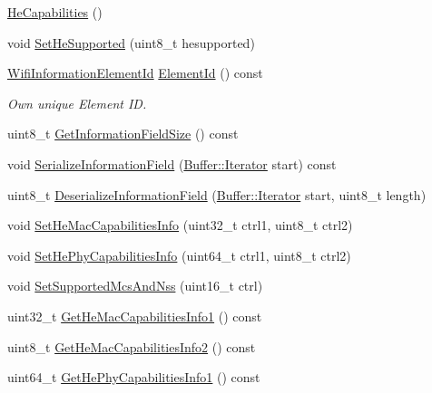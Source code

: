 \begin{DoxyCompactItemize}
\item 
\hyperlink{classns3_1_1HeCapabilities_a95908473615c6161c2783fa9c1cdecce}{He\+Capabilities} ()
\item 
void \hyperlink{classns3_1_1HeCapabilities_a27bea40f066d180bb70a5998583359c3}{Set\+He\+Supported} (uint8\+\_\+t hesupported)
\item 
\hyperlink{namespacens3_aeb185e0c8a60816016bca079f1420478}{Wifi\+Information\+Element\+Id} \hyperlink{classns3_1_1HeCapabilities_adda8ae15136a896da545f45ebf088632}{Element\+Id} () const 
\begin{DoxyCompactList}\small\item\em Own unique Element ID. \end{DoxyCompactList}\item 
uint8\+\_\+t \hyperlink{classns3_1_1HeCapabilities_a85af5c252ecd8d48a1628cd9f9163687}{Get\+Information\+Field\+Size} () const 
\item 
void \hyperlink{classns3_1_1HeCapabilities_a68225cd20307319d11a976ce9da3c4b2}{Serialize\+Information\+Field} (\hyperlink{classns3_1_1Buffer_1_1Iterator}{Buffer\+::\+Iterator} start) const 
\item 
uint8\+\_\+t \hyperlink{classns3_1_1HeCapabilities_abe136c82493c270542f2dec0c7f2c849}{Deserialize\+Information\+Field} (\hyperlink{classns3_1_1Buffer_1_1Iterator}{Buffer\+::\+Iterator} start, uint8\+\_\+t length)
\item 
void \hyperlink{classns3_1_1HeCapabilities_aaa60661c648f6f1727bb8659ff8af45d}{Set\+He\+Mac\+Capabilities\+Info} (uint32\+\_\+t ctrl1, uint8\+\_\+t ctrl2)
\item 
void \hyperlink{classns3_1_1HeCapabilities_a7059ae2294826c1977ea5d6f882000ce}{Set\+He\+Phy\+Capabilities\+Info} (uint64\+\_\+t ctrl1, uint8\+\_\+t ctrl2)
\item 
void \hyperlink{classns3_1_1HeCapabilities_a390b0eabf37b0096bb4802d81a93b1fe}{Set\+Supported\+Mcs\+And\+Nss} (uint16\+\_\+t ctrl)
\item 
uint32\+\_\+t \hyperlink{classns3_1_1HeCapabilities_abcc5a990d62271e5f9355eab60f0cc62}{Get\+He\+Mac\+Capabilities\+Info1} () const 
\item 
uint8\+\_\+t \hyperlink{classns3_1_1HeCapabilities_a9944dc8b17e2de0eb8888ab0aaf1abe4}{Get\+He\+Mac\+Capabilities\+Info2} () const 
\item 
uint64\+\_\+t \hyperlink{classns3_1_1HeCapabilities_a85cc1d017993f743a0c7cffb25dba8d0}{Get\+He\+Phy\+Capabilities\+Info1} () const 

\end{DoxyCompactItemize}
